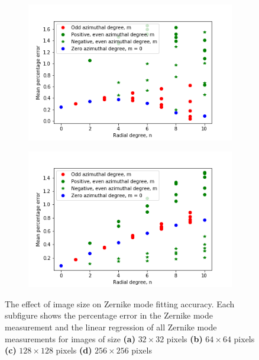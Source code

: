 \begin{figure}[h]
	\begin{subfigure}{0.48\textwidth}
		\centering
		\includegraphics[width=\linewidth]{images/Zernike_fitting_percentage_error_one_mode_128_shape_radial_azimuthal_pos_neg.png}
		\caption{}
		\label{fig:Zernike_fitting_percentage_error_one_mode_128_shape}
	\end{subfigure}
	\begin{subfigure}{0.48\textwidth}
		\centering
		\includegraphics[width=\linewidth]{images/Zernike_fitting_percentage_error_one_mode_256_shape_radial_azimuthal_pos_neg.png}
		\caption{}
		\label{fig:Zernike_fitting_percentage_error_one_mode_256_shape}
	\end{subfigure}
	\caption[The effect of image size on Zernike mode fitting accuracy]{The 
		effect of image size on Zernike mode fitting accuracy. Each 
		subfigure shows the percentage error in the Zernike mode 
		measurement and the linear regression of all Zernike mode 
		measurements for images of size \textbf{(a)} $32\times32$ pixels 
		\textbf{(b)} $64\times64$ pixels \textbf{(c)} $128\times128$ pixels 
		\textbf{(d)} $256\times256$ pixels}
	\label{fig:zernike_fitting_accuracy}
\end{figure}

